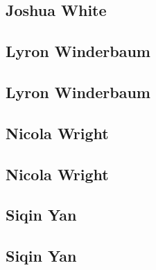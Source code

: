 \documentclass[twoside,14pt,a4paper,notitlepage]{memoir}
\begin{document}
\lipsum[1-2]
\subsection*{Joshua White}
\lipsum[3]



\subsection*{Lyron Winderbaum}
\label{aut:winderbaum}

\lipsum[1-2]
\subsection*{Lyron Winderbaum}
\lipsum[3]



\subsection*{Nicola Wright}
\label{aut:wright}

\lipsum[1-2]
\subsection*{Nicola Wright}
\lipsum[3]



\subsection*{Siqin Yan}
\label{aut:yan}

\lipsum[1-2]
\subsection*{Siqin Yan}
\lipsum[3]
\end{document}
